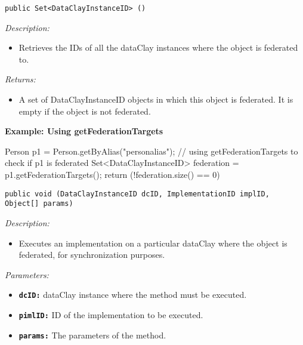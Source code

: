 
\begin{dBox}
\texttt{public Set<DataClayInstanceID> ()}
\LINE

{\it Description:}

\begin{itemize}
 \item Retrieves the IDs of all the dataClay instances where the object is federated to. 
\end{itemize}

{\it Returns:}

\begin{itemize}
 \item A set of DataClayInstanceID objects in which this object is federated. 
 It is empty if the object is not federated.
\end{itemize}

\end{dBox}

\begin{tBox}
\textcolor{basecolor} {\bf Example: Using getFederationTargets}
\begin{java}
Person p1 = Person.getByAlias("personalias");
// using getFederationTargets to check if p1 is federated
Set<DataClayInstanceID> federation = p1.getFederationTargets();
return (!federation.size() == 0)
\end{java}
\end{tBox}


\begin{dBox}
\texttt{public void (DataClayInstanceID dcID, \newline ImplementationID implID, Object[] params)} 
\LINE

{\it Description:}

\begin{itemize}
  \item Executes an implementation on a particular dataClay where the object is federated, for synchronization purposes.
\end{itemize}

{\it Parameters:}

\begin{itemize}
  \item \texttt{\bfseries dcID:} dataClay instance where the method must be executed.
  \item \texttt{\bfseries pimlID:} ID of the implementation to be executed.
  \item \texttt{\bfseries params:} The parameters of the method.
\end{itemize}
 
\end{dBox}

